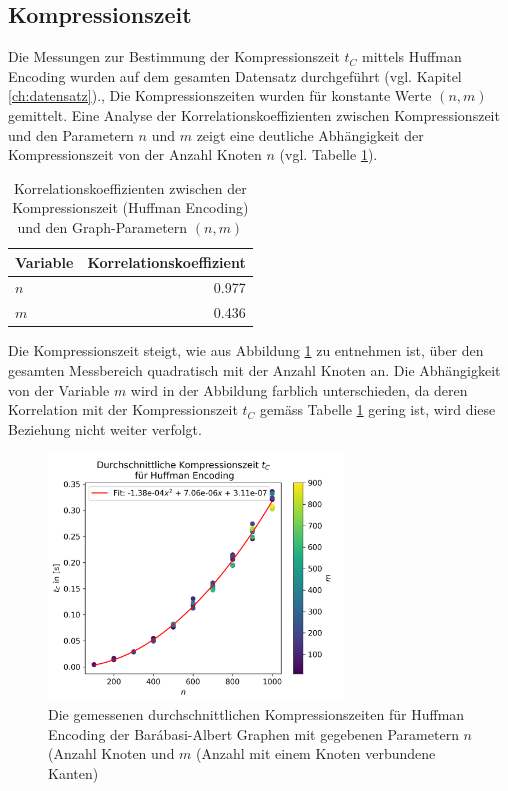 \documentclass{ffhsthesis}
\begin{document}
\subsection{Kompressionszeit}
Die Messungen zur Bestimmung der Kompressionszeit $t_{C}$ mittels Huffman Encoding wurden auf dem gesamten Datensatz durchgeführt (vgl. Kapitel \ref{ch:datensatz})., Die Kompressionszeiten wurden für konstante Werte $(n,m)$ gemittelt. Eine Analyse der Korrelationskoeffizienten zwischen Kompressionszeit und den Parametern $n$ und $m$ zeigt eine deutliche Abhängigkeit der Kompressionszeit von der Anzahl Knoten $n$ (vgl. Tabelle \ref{tab:coefficients}). 
\begin{table}[h]
\centering
\begin{tabular}{@{}lr@{}}
\toprule
Variable    & Korrelationskoeffizient \\
\midrule
$n$ & 0.977 \\
$m$ & 0.436 \\
\bottomrule
\end{tabular}
\caption{Korrelationskoeffizienten zwischen der Kompressionszeit (Huffman Encoding) und den Graph-Parametern $(n,m)$}
\label{tab:coefficients}
\end{table}
Die Kompressionszeit steigt, wie aus Abbildung \ref{fig:huffmantime} zu entnehmen ist, über den gesamten Messbereich quadratisch mit der Anzahl Knoten an. Die Abhängigkeit von der Variable $m$ wird in der Abbildung farblich unterschieden, da deren Korrelation mit der Kompressionszeit $t_{C}$ gemäss Tabelle \ref{tab:coefficients} gering ist, wird diese Beziehung nicht weiter verfolgt.
\begin{figure}[H]
    \centering
    \includegraphics[width=0.7\textwidth]{images/huffmantime.png}
    \caption{Die gemessenen durchschnittlichen Kompressionszeiten für Huffman Encoding der Barábasi-Albert Graphen mit gegebenen Parametern $n$ (Anzahl Knoten und $m$ (Anzahl mit einem Knoten verbundene Kanten)}
    \label{fig:huffmantime}
\end{figure}
\end{document}
